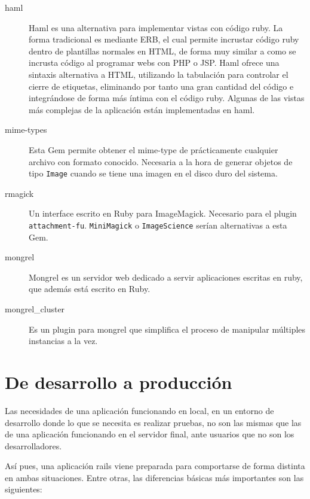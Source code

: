 \begin{description}
  \item[haml] Haml es una alternativa para implementar vistas con código ruby. La forma tradicional es mediante ERB, el cual permite incrustar código ruby dentro de plantillas normales en HTML, de forma muy similar a como se incrusta código al programar webs con PHP o JSP. Haml ofrece una sintaxis alternativa a HTML, utilizando la tabulación para controlar el cierre de etiquetas, eliminando por tanto una gran cantidad del código e integrándose de forma más íntima con el código ruby. Algunas de las vistas más complejas de la aplicación están implementadas en haml.
  
  \item[mime-types] Esta Gem permite obtener el mime-type de prácticamente cualquier archivo con formato conocido. Necesaria a la hora de generar objetos de tipo \texttt{Image} cuando se tiene una imagen en el disco duro del sistema.
  
  \item[rmagick] Un interface escrito en Ruby para ImageMagick. Necesario para el plugin \texttt{attachment-fu}. \texttt{MiniMagick} o \texttt{ImageScience} serían alternativas a esta Gem.
  
  \item[mongrel] Mongrel es un servidor web dedicado a servir aplicaciones escritas en ruby, que además está escrito en Ruby.
  
  \item[mongrel\_cluster] Es un plugin para mongrel que simplifica el proceso de manipular múltiples instancias a la vez.
  
\end{description}



\section{De desarrollo a producción} %
\label{sec:producción}

Las necesidades de una aplicación funcionando en local, en un entorno de desarrollo donde lo que se necesita es realizar pruebas, no son las mismas que las de una aplicación funcionando en el servidor final, ante usuarios que no son los desarrolladores.

Así pues, una aplicación rails viene preparada para comportarse de forma distinta en ambas situaciones. Entre otras, las diferencias básicas más importantes son las siguientes:

